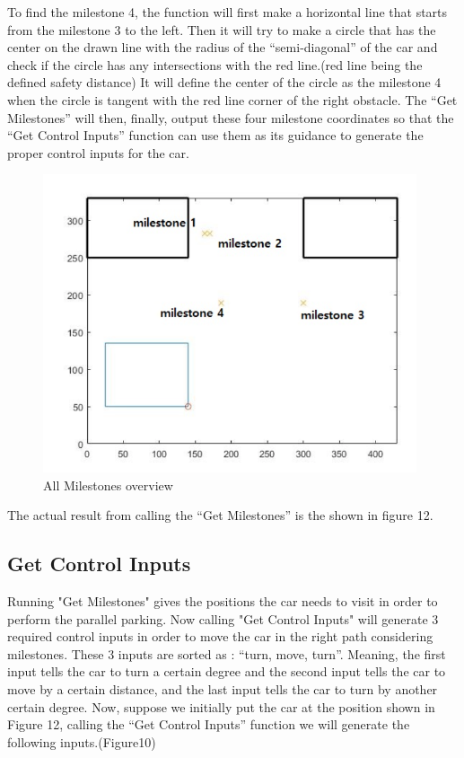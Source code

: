 \documentclass[12pt, letterpaper]{amsart} %
\numberwithin{equation}{section}
\begin{document}
To find the milestone 4, the function will first make a horizontal line that starts from the milestone 3 to the left. 
Then it will try to make a circle that has the center on the drawn line with the radius of the “semi-diagonal” of the car and check if the circle has any intersections with the red line.(red line being the defined safety distance)
It will define the center of the circle as the milestone 4 when the circle is tangent with the red line corner of the right obstacle.
The “Get Milestones” will then, finally, output these four milestone coordinates so that the “Get Control Inputs” function can use them as its guidance to generate the proper control inputs for the car.

\begin{figure}[h!]
\includegraphics[width=110mm]{./img/fig_12.png}
\caption{All Milestones overview}
\label{fig:figure12}	
\end{figure}

The actual result from calling the “Get Milestones” is the shown in figure 12. 

\newpage

\subsection{Get Control Inputs}
Running "Get Milestones" gives the positions the car needs to visit in order to perform the parallel parking.  
Now calling "Get Control Inputs" will generate 3 required control inputs in order to move the car in the right path considering milestones.  
These 3 inputs are sorted as :  “turn, move, turn”. Meaning, the first input tells the car to turn a certain degree and the second input tells the car to move by a certain distance, and the last input tells the car to turn by another certain degree.
\linebreak
Now, suppose we initially put the car at the position  shown in Figure 12, calling the “Get Control Inputs” function we will generate the following inputs.(Figure10)
\end{document}
